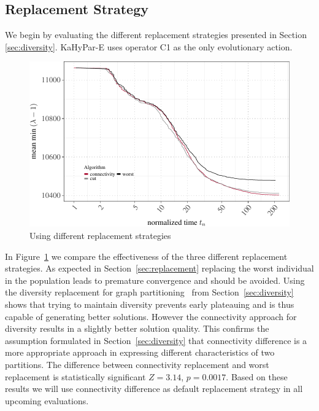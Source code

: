 \documentclass[a4paper,12pt,titlepage, BCOR7mm,headsepline]{scrbook}
\numberwithin{equation}{section}
\begin{document}
\subsection{Replacement Strategy}
We begin by evaluating the different replacement strategies presented in Section \ref{sec:diversity}. KaHyPar-E uses operator C1 as the only evolutionary action.
\begin{figure}[H]


\begin{center}
\includegraphics{rnw/tuning_subset_plots/replace_plot-1}\caption{Using different replacement strategies}\label{fig:replacement}
\end{center}

\end{figure}
In Figure~\ref{fig:replacement} we compare the effectiveness of the three different replacement strategies. As expected in Section~\ref{sec:replacement} replacing the worst individual in the population leads to premature convergence and should be avoided. Using the diversity replacement for graph partitioning~\cite{sanders2012distributed} from Section~\ref{sec:diversity} shows that trying to maintain diversity prevents early plateauing and is thus capable of generating better solutions. However the connectivity approach for diversity results in a slightly better solution quality. This confirms the assumption formulated in Section~\ref{sec:diversity} that connectivity difference is a more appropriate approach in expressing different characteristics of two partitions. The difference between connectivity replacement and worst replacement is statistically significant $Z = 3.14$, $p = 0.0017$. Based on these results we will use connectivity difference as default replacement strategy in all upcoming evaluations.
\end{document}
